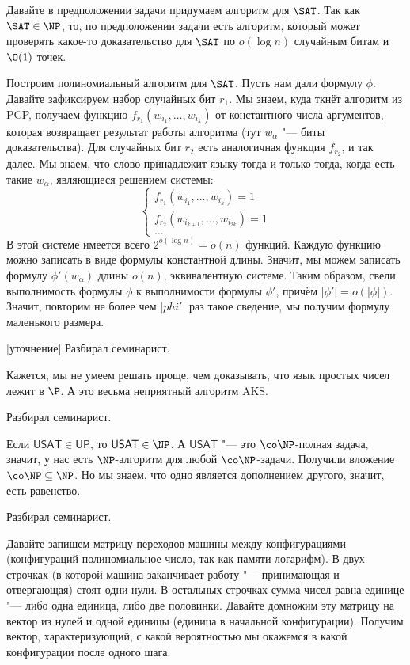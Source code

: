	Давайте в предположении задачи придумаем алгоритм для $\SAT$.
	Так как $\SAT \in \NP$, то, по предположении задачи есть алгоритм, который
	может проверять какое-то доказательство для $\SAT$ по $o(\log n)$ случайным битам и $\O(1)$ точек.

	Построим полиномиальный алгоритм для $\SAT$.
	Пусть нам дали формулу $\phi$.
	Давайте зафиксируем набор случайных бит $r_1$.
	Мы знаем, куда ткнёт алгоритм из PCP, получаем функцию $f_{r_1}(w_{i_1}, \dots, w_{i_k})$ от константного
	числа аргументов, которая возвращает результат работы алгоритма (тут $w_{\alpha}$ "--- биты доказательства).
	Для случайных бит $r_2$ есть аналогичная функция $f_{r_2}$, и так далее.
	Мы знаем, что слово принадлежит языку тогда и только тогда, когда есть такие $w_{\alpha}$, являющиеся решением системы:
	\[
		\begin{cases}
			f_{r_1}(w_{i_1}, \dots, w_{i_k}) = 1 \\
			f_{r_2}(w_{i_{k+1}}, \dots, w_{i_{2k}}) = 1 \\
			\dots
		\end{cases}
	\]
	В этой системе имеется всего $2^{o(\log n)}=o(n)$ функций.
	Каждую функцию можно записать в виде формулы константной длины.
	Значит, мы можем записать формулу $\phi'(w_{\alpha})$ длины $o(n)$, эквивалентную системе.
	Таким образом, свели выполнимость формулы $\phi$ к выполнимости формулы $\phi'$, причём $|\phi'|=o(|\phi|)$.
	Значит, повторим не более чем $|phi'|$ раз такое сведение, мы получим формулу маленького размера.

[уточнение]
	Разбирал семинарист.

	Кажется, мы не умеем решать проще, чем доказывать, что язык простых чисел лежит в $\P$.
	А это весьма неприятный алгоритм AKS.

	Разбирал семинарист.

	Если $\mathsf{USAT} \in \mathsf{UP}$, то $\mathsf{USAT} \in \NP$.
	А $\mathsf{USAT}$ "--- это $\co\NP$-полная задача, значит, у нас есть $\NP$-алгоритм для любой $\co\NP$-задачи.
	Получили вложение $\co\NP \subseteq \NP$.
	Но мы знаем, что одно является дополнением другого, значит, есть равенство.

	Разбирал семинарист.

	Давайте запишем матрицу переходов машины между конфигурациями (конфигураций полиномиальное число,
	так как памяти логарифм).
	В двух строчках (в которой машина заканчивает работу "--- принимающая и отвергающая) стоят одни нули.
	В остальных строчках сумма чисел равна единице "--- либо одна единица, либо две половинки.
	Давайте домножим эту матрицу на вектор из нулей и одной единицы (единица в начальной конфигурации).
	Получим вектор, характеризующий, с какой вероятностью мы окажемся в какой конфигурации после одного шага.

